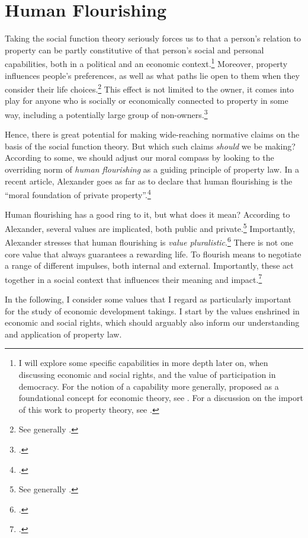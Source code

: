 \section{Human Flourishing}\label{sec:2:5}

Taking the social function theory seriously forces us to  that a person's relation to property can be partly constitutive of that person's social and personal capabilities, both in a political and an economic context.\footnote{I will explore some specific capabilities in more depth later on, when discussing economic and social rights, and the value of participation in democracy. For the notion of a capability more generally, proposed as a foundational concept for economic theory, see \cite{sen85}. For a discussion on the import of this work to property theory, see \cite[105]{alexander09}.} Moreover, property influences people's preferences, as well as what paths lie open to them when they consider their life choices.\footnote{See generally \cite{alexander09}.} This effect is not limited to the owner, it comes into play for anyone who is socially or economically connected to property in some way, including a potentially large group of non-owners.\footcite[128-129]{alexander09d}

Hence, there is great potential for making wide-reaching normative claims on the basis of the social function theory. But which such claims {\it should} we be making? According to some, we should adjust our moral compass by looking to the overriding norm of {\it human flourishing} as a guiding principle of property law. In a recent article, Alexander goes as far as to declare that human flourishing is the ``moral foundation of private property''.\footcite[1261]{alexander14} 

Human flourishing has a good ring to it, but what does it mean? According to Alexander, several values are implicated, both public and private.\footnote{See generally \cite{alexander14,alexander11}.} Importantly, Alexander stresses that human flourishing is {\it value pluralistic}.\footnote{\cite[750-751]{alexander09}.} There is not one core value that always guarantees a rewarding life. To flourish means to negotiate a range of different impulses, both internal and external. Importantly, these act together in a social context that influences their meaning and impact.\footcite[1035-1052]{alexander11}

In the following, I consider some values that I regard as particularly important for the study of economic development takings. I start by the values enshrined in economic and social rights, which should arguably also inform our understanding and application of property law.

